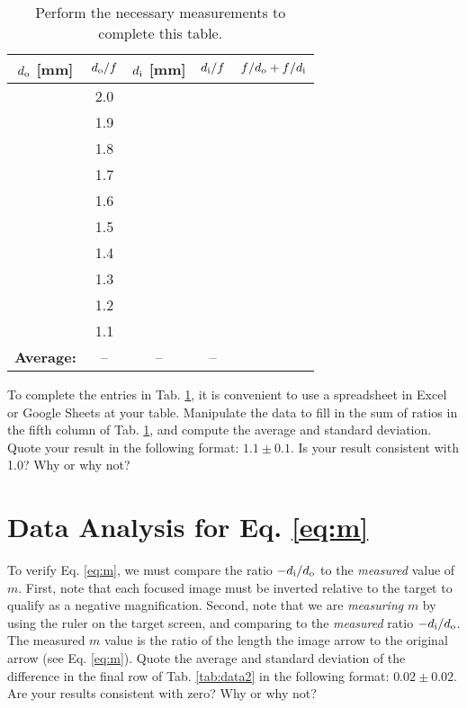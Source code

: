 \documentclass[12pt,twocolumn]{article}
\begin{document}
\begin{table}[ht]
\footnotesize
\centering
\begin{tabular}{| c | c | c | c | c |}
\hline
\textbf{$d_{\rm o}$ [mm]} & \textbf{$d_{\rm o}/f$} & \textbf{$d_{\rm i}$ [mm]} & \textbf{$d_{\rm i}/f$} & $f/d_{\rm o} + f/d_{\rm i}$\\ \hline
 & 2.0 & & & \\ \hline
 & 1.9 & & & \\ \hline
 & 1.8 & & & \\ \hline
 & 1.7 & & & \\ \hline
 & 1.6 & & & \\ \hline
 & 1.5 & & & \\ \hline
 & 1.4 & & & \\ \hline
 & 1.3 & & & \\ \hline
 & 1.2 & & & \\ \hline
 & 1.1 & & & \\ \hline \hline
\textbf{Average:} & -- & -- & -- & \\ \hline
\end{tabular}
\caption{\label{tab:data} Perform the necessary measurements to complete this table.}
\end{table}

To complete the entries in Tab. \ref{tab:data}, it is convenient to use a spreadsheet in Excel or Google Sheets at your table.  Manipulate the data to fill in the sum of ratios in the fifth column of Tab. \ref{tab:data}, and compute the average and standard deviation.  Quote your result in the following format: $1.1 \pm 0.1$.  Is your result consistent with 1.0?  Why or why not?

\section{Data Analysis for Eq. \ref{eq:m}}

To verify Eq. \ref{eq:m}, we must compare the ratio $-d_{\rm i}/d_{\rm o}$ to the \textit{measured} value of $m$.  First, note that each focused image must be inverted relative to the target to qualify as a negative magnification.  Second, note that we are \textit{measuring} $m$ by using the ruler on the target screen, and comparing to the \textit{measured} ratio $-d_{\rm i}/d_{\rm o}$.  The measured $m$ value is the ratio of the length the image arrow to the original arrow (see Eq. \ref{eq:m}).  Quote the average and standard deviation of the difference in the final row of Tab. \ref{tab:data2} in the following format: $0.02 \pm 0.02$.  Are your results consistent with zero?  Why or why not?
\end{document}
